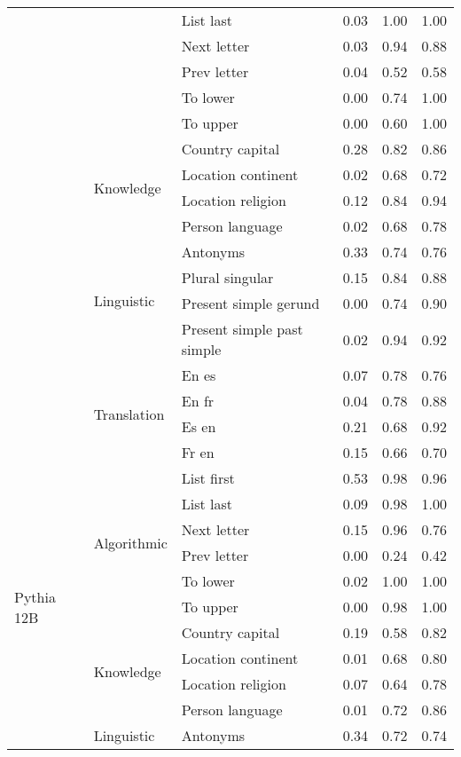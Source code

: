 \begin{center}
\begin{longtable}{lllrrr}
 &  & List last & 0.03 & 1.00 & 1.00 \\
 &  & Next letter & 0.03 & 0.94 & 0.88 \\
 &  & Prev letter & 0.04 & 0.52 & 0.58 \\
 &  & To lower & 0.00 & 0.74 & 1.00 \\
 &  & To upper & 0.00 & 0.60 & 1.00 \\
\cline{2-6}
 & \multirow[t]{4}{*}{Knowledge} & Country capital & 0.28 & 0.82 & 0.86 \\
 &  & Location continent & 0.02 & 0.68 & 0.72 \\
 &  & Location religion & 0.12 & 0.84 & 0.94 \\
 &  & Person language & 0.02 & 0.68 & 0.78 \\
\cline{2-6}
 & \multirow[t]{4}{*}{Linguistic} & Antonyms & 0.33 & 0.74 & 0.76 \\
 &  & Plural singular & 0.15 & 0.84 & 0.88 \\
 &  & Present simple gerund & 0.00 & 0.74 & 0.90 \\
 &  & Present simple past simple & 0.02 & 0.94 & 0.92 \\
\cline{2-6}
 & \multirow[t]{4}{*}{Translation} & En es & 0.07 & 0.78 & 0.76 \\
 &  & En fr & 0.04 & 0.78 & 0.88 \\
 &  & Es en & 0.21 & 0.68 & 0.92 \\
 &  & Fr en & 0.15 & 0.66 & 0.70 \\
\cline{1-6} \cline{2-6}
\multirow[t]{18}{*}{Pythia 12B} & \multirow[t]{6}{*}{Algorithmic} & List first & 0.53 & 0.98 & 0.96 \\
 &  & List last & 0.09 & 0.98 & 1.00 \\
 &  & Next letter & 0.15 & 0.96 & 0.76 \\
 &  & Prev letter & 0.00 & 0.24 & 0.42 \\
 &  & To lower & 0.02 & 1.00 & 1.00 \\
 &  & To upper & 0.00 & 0.98 & 1.00 \\
\cline{2-6}
 & \multirow[t]{4}{*}{Knowledge} & Country capital & 0.19 & 0.58 & 0.82 \\
 &  & Location continent & 0.01 & 0.68 & 0.80 \\
 &  & Location religion & 0.07 & 0.64 & 0.78 \\
 &  & Person language & 0.01 & 0.72 & 0.86 \\
\cline{2-6}
 & \multirow[t]{4}{*}{Linguistic} & Antonyms & 0.34 & 0.72 & 0.74 \\

\end{longtable}
\end{center}
